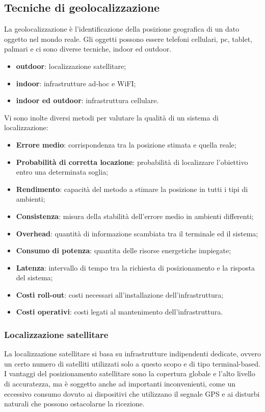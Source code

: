 \subsection{Tecniche di geolocalizzazione}
La geolocalizzazione è l'identificazione della posizione geografica di un dato oggetto nel mondo reale.
Gli oggetti possono essere telefoni cellulari, pc, tablet, palmari e ci sono diverse tecniche, indoor ed outdoor.
\begin{itemize}
\item \textbf{outdoor}: localizzazione satellitare;
\item \textbf{indoor}: infrastrutture ad-hoc e WiFI;
\item \textbf{indoor ed outdoor}: infrastruttura cellulare.
\end{itemize}
Vi sono inolte diversi metodi per valutare la qualità di un sistema di localizzazione:
\begin{itemize}
\item \textbf{Errore medio}: corrispondenza tra la posizione stimata e quella reale;
\item \textbf{Probabilità di corretta locazione}: probabilità di localizzare l'obiettivo entro una determinata soglia;
\item \textbf{Rendimento}: capacità del metodo a stimare la posizione in tutti i tipi di ambienti;
\item \textbf{Consistenza}: misura della stabilità dell'errore medio in ambienti differenti;
\item \textbf{Overhead}: quantità di informazione scambiata tra il terminale ed il sistema;
\item \textbf{Consumo di potenza}: quantita delle risorse energetiche impiegate;
\item \textbf{Latenza}: intervallo di tempo tra la richiesta di posizionamento e la risposta del sistema;
\item \textbf{Costi roll-out}: costi necessari all'installazione dell'infrastruttura;
\item \textbf{Costi operativi}: costi legati al mantenimento dell'infrastruttura.
\end{itemize}

\subsubsection{Localizzazione satellitare}
La localizzazione satellitare si basa su infrastrutture indipendenti dedicate, ovvero un certo numero di satelliti utilizzati solo a questo scopo e di tipo terminal-based.
I vantaggi del posizionamento satellitare sono la copertura globale e l'alto livello di accuratezza, ma è soggetto anche ad importanti inconvenienti, come un eccessivo consumo dovuto ai dispositivi che utilizzano il segnale GPS e ai disturbi naturali che possono ostacolarne la ricezione.

